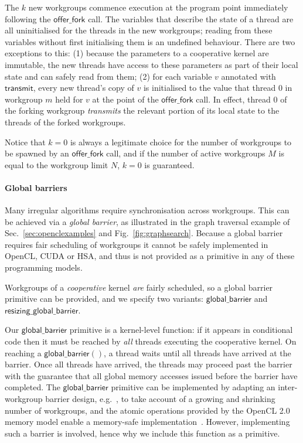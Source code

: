 \documentclass[numbers,nocopyrightspace,10pt]{sigplanconf}
\newcommand{\myfig}{Fig.~}
\newcommand{\mysec}{Sec.~}
\newcommand{\transmit}{\mathsf{transmit}}
\newcommand{\offerfork}{\mathsf{offer\_fork}}
\newcommand{\globalbarrier}{\mathsf{global\_barrier}}
\newcommand{\resizingglobalbarrier}{\mathsf{resizing\_global\_barrier}}
\begin{document}
The $k$ new workgroups commence execution at the program point
immediately following the $\offerfork$ call.  The variables that
describe the state of a thread are all uninitialised for the threads
in the new workgroups; reading from these variables without first
initialising them is an undefined behaviour.  There are two exceptions
to this: (1) because the parameters to a cooperative kernel are
immutable, the new threads have access to these parameters as part of
their local state and can safely read from them; (2) for each variable
$v$ annotated with $\transmit$, every new thread's copy of $v$ is
initialised to the value that thread 0 in workgroup $m$ held for $v$
at the point of the $\offerfork$ call.
%
In effect, thread 0 of the forking workgroup \emph{transmits} the relevant
portion of its local state to the threads of the forked workgroups.


Notice that $k=0$ is always a legitimate choice for the number of
workgroups to be spawned by an $\offerfork$ call, and if the number of
active workgroups $M$ is equal to the workgroup limit $N$, $k=0$ is
guaranteed.

\paragraph{Global barriers}

Many irregular algorithms require synchronisation across workgroups.
This can be achieved via a \emph{global barrier}, as illustrated in the graph traversal example of \mysec\ref{sec:openclexamples} and \myfig\ref{fig:graphsearch}.
Because a global barrier requires fair scheduling of workgroups it cannot be safely implemented in OpenCL, CUDA or HSA, and thus is not provided as a primitive in any of these programming models.

Workgroups of a \emph{cooperative} kernel \emph{are} fairly scheduled, so a
global barrier primitive can be provided, and we specify two variants: $\globalbarrier$
and $\resizingglobalbarrier$.

Our $\globalbarrier$ primitive is a kernel-level function: if it
appears in conditional code then it must be reached by \emph{all}
threads executing the cooperative kernel.  On reaching a
$\globalbarrier()$, a thread waits until all threads have arrived at
the barrier.  Once all threads have arrived, the threads may proceed
past the barrier with the guarantee that all global memory accesses
issued before the barrier have completed.  The $\globalbarrier$
primitive can be implemented by adapting an inter-workgroup barrier
design, e.g.~\cite{XF10}, to take account of a growing and shrinking number of workgroups, and the atomic operations provided by
the OpenCL 2.0 memory model enable a memory-safe
implementation~\cite{DBLP:conf/oopsla/SorensenDBGR16}.  However, implementing such a barrier is
involved, hence why we include this function as a primitive.
\end{document}
